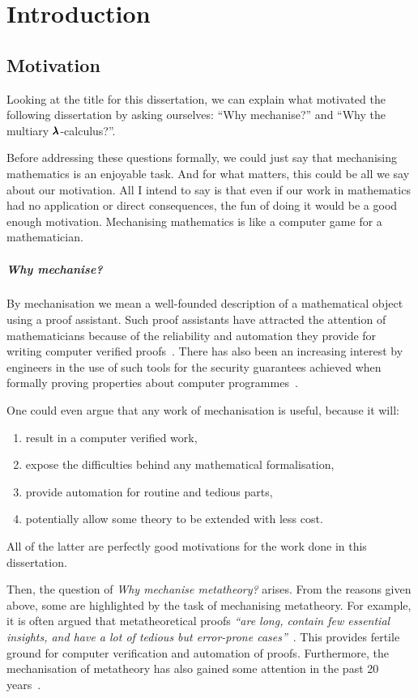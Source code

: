 \chapter{Introduction}
\label{c:intro}

\section{Motivation}
Looking at the title for this dissertation, we can explain what motivated the following dissertation by asking ourselves: ``Why mechanise?'' and ``Why the multiary $\pmb{\lambda}$-calculus?''.

Before addressing these questions formally, we could just say that mechanising mathematics is an enjoyable task.
And for what matters, this could be all we say about our motivation.
All I intend to say is that even if our work in mathematics had no application or direct consequences, the fun of doing it would be a good enough motivation.
Mechanising mathematics is like a computer game for a mathematician.

\paragraph{Why mechanise?}
By mechanisation we mean a well-founded description of a mathematical object using a proof assistant.
Such proof assistants have attracted the attention of mathematicians because of the reliability and automation they provide for writing computer verified proofs~\cite{FourColourThm}.
There has also been an increasing interest by engineers in the use of such tools for the security guarantees achieved when formally proving properties about computer programmes~\cite{CompCert}.

One could even argue that any work of mechanisation is useful, because it will:
\begin{enumerate}
\item result in a computer verified work,
\item expose the difficulties behind any mathematical formalisation,
\item provide automation for routine and tedious parts,
\item potentially allow some theory to be extended with less cost.
\end{enumerate}

All of the latter are perfectly good motivations for the work done in this dissertation.

Then, the question of \textit{Why mechanise metatheory?} arises.
From the reasons given above, some are highlighted by the task of mechanising metatheory.
For example, it is often argued that metatheoretical proofs \textit{``are long, contain few essential insights, and have a lot of tedious but error-prone cases''}~\cite{AutosubstSchafer}.
This provides fertile ground for computer verification and automation of proofs.
Furthermore, the mechanisation of metatheory has also gained some attention in the past 20 years~\cite{POPLmark, POPLmarkReloaded}.

